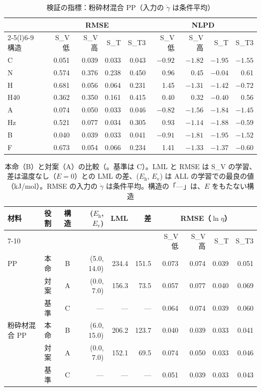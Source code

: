 \documentclass[paper=a4paper,fontsize=10.5pt,line_length=44zw,number_of_lines=38]{jlreq}
\newcommand{\file}[1]{\texttt{\detokenize{#1}}}
\newcommand{\gd}{\dot{\gamma}}
\newcommand{\Eh}{E_{\mathrm{h}}}
\newcommand{\Ev}{E_{\mathrm{v}}}
\begin{document}
\begin{table}[H]
\caption{検証の指標：粉砕材混合 PP（入力の $\gd$ は条件平均）}\label{tab:m_mix}
\begin{tabularx}{\linewidth}{@{}l*{8}{r}@{}}
\toprule
 & \multicolumn{4}{c}{RMSE} & \multicolumn{4}{c}{NLPD} \\
\cmidrule(lr){2-5}\cmidrule(l){6-9}
構造 & S\_V 低 & S\_V 高 & S\_T & S\_T3 & S\_V 低 & S\_V 高 & S\_T & S\_T3 \\
\midrule
C & 0.051 & 0.039 & 0.033 & 0.043 & $-0.92$ & $-1.82$ & $-1.95$ & $-1.55$ \\
N & 0.574 & 0.376 & 0.238 & 0.450 & 0.96 & 0.45 & $-0.04$ & 0.61 \\
H & 0.681 & 0.056 & 0.064 & 0.231 & 1.45 & $-1.31$ & $-1.42$ & $-0.72$ \\
H40 & 0.362 & 0.350 & 0.161 & 0.415 & 0.40 & 0.32 & $-0.40$ & 0.56 \\
A & 0.074 & 0.050 & 0.033 & 0.046 & $-0.82$ & $-1.56$ & $-1.84$ & $-1.45$ \\
Hz & 0.521 & 0.077 & 0.034 & 0.305 & 0.93 & $-1.14$ & $-1.88$ & $-0.59$ \\
B & 0.040 & 0.039 & 0.033 & 0.041 & $-0.91$ & $-1.81$ & $-1.95$ & $-1.52$ \\
F & 0.673 & 0.054 & 0.066 & 0.234 & 1.41 & $-1.33$ & $-1.37$ & $-0.60$ \\
\bottomrule
\end{tabularx}
\end{table}

\begin{table}[H]
\caption{本命（B）と対案（A）の比較（\file{main_vs_alt.csv}。基準は C）。LML と RMSE は S\_V の学習、差は温度なし（$E=0$）との LML の差、($\Eh$, $\Ev$) は ALL の学習での最良の値（kJ/mol）。RMSE の入力の $\gd$ は条件平均。構造の「---」は、$E$ をもたない構造}\label{tab:main}
{\small
\setlength{\tabcolsep}{3.2pt}
\begin{tabular}{@{}llcrrrrrrr@{}}
\toprule
材料 & 役割 & 構造 & ($\Eh$, $\Ev$) & LML & 差 & \multicolumn{4}{c}{RMSE（$\ln\eta$）} \\
\cmidrule(l){7-10}
 & & & & & & S\_V 低 & S\_V 高 & S\_T & S\_T3 \\
\midrule
PP & 本命 & B & (5.0, 14.0) & 234.4 & 151.5 & 0.073 & 0.074 & 0.039 & 0.051 \\
 & 対案 & A & (0.0, 7.0) & 156.3 & 73.5 & 0.057 & 0.077 & 0.040 & 0.069 \\
 & 基準 & C & --- & --- & --- & 0.064 & 0.074 & 0.039 & 0.060 \\
粉砕材混合 PP & 本命 & B & (6.0, 15.0) & 206.2 & 123.7 & 0.040 & 0.039 & 0.033 & 0.041 \\
 & 対案 & A & (0.0, 7.0) & 152.1 & 69.5 & 0.074 & 0.050 & 0.033 & 0.046 \\
 & 基準 & C & --- & --- & --- & 0.051 & 0.039 & 0.033 & 0.043 \\
\bottomrule
\end{tabular}}
\end{table}
\end{document}
